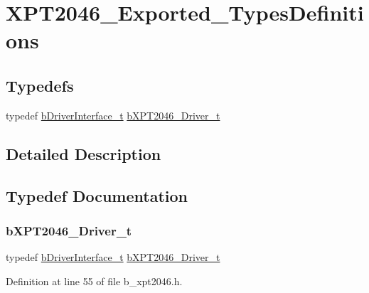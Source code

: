 \hypertarget{group___x_p_t2046___exported___types_definitions}{}\section{X\+P\+T2046\+\_\+\+Exported\+\_\+\+Types\+Definitions}
\label{group___x_p_t2046___exported___types_definitions}
\subsection*{Typedefs}
\begin{DoxyCompactItemize}
\item 
typedef \mbox{\hyperlink{structb_driver_interface__t}{b\+Driver\+Interface\+\_\+t}} \mbox{\hyperlink{group___x_p_t2046___exported___types_definitions_ga9851b9956c106dac31a925346a103871}{b\+X\+P\+T2046\+\_\+\+Driver\+\_\+t}}
\end{DoxyCompactItemize}


\subsection{Detailed Description}


\subsection{Typedef Documentation}
\mbox{\label{group___x_p_t2046___exported___types_definitions_ga9851b9956c106dac31a925346a103871}} 
\subsubsection{\texorpdfstring{b\+X\+P\+T2046\+\_\+\+Driver\+\_\+t}{bXPT2046\_Driver\_t}}
{\footnotesize\ttfamily typedef \mbox{\hyperlink{structb_driver_interface__t}{b\+Driver\+Interface\+\_\+t}} \mbox{\hyperlink{group___x_p_t2046___exported___types_definitions_ga9851b9956c106dac31a925346a103871}{b\+X\+P\+T2046\+\_\+\+Driver\+\_\+t}}}



Definition at line 55 of file b\+\_\+xpt2046.\+h.

